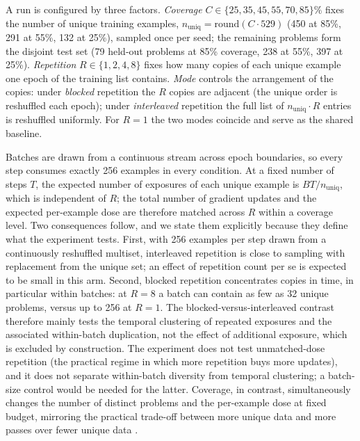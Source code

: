 \documentclass[10pt]{article}
\newcommand{\coverage}{C}
\newcommand{\repetition}{R}
\begin{document}
A run is configured by three factors. \emph{Coverage} $\coverage \in \{25,35,45,55,70,85\}\%$ fixes the number of unique training examples, $n_{\mathrm{uniq}} = \mathrm{round}(\coverage \cdot 529)$ (450 at 85\%, 291 at 55\%, 132 at 25\%), sampled once per seed; the remaining problems form the disjoint test set (79 held-out problems at 85\% coverage, 238 at 55\%, 397 at 25\%). \emph{Repetition} $\repetition \in \{1,2,4,8\}$ fixes how many copies of each unique example one epoch of the training list contains. \emph{Mode} controls the arrangement of the copies: under \emph{blocked} repetition the $\repetition$ copies are adjacent (the unique order is reshuffled each epoch); under \emph{interleaved} repetition the full list of $n_{\mathrm{uniq}} \cdot \repetition$ entries is reshuffled uniformly. For $\repetition = 1$ the two modes coincide and serve as the shared baseline.

Batches are drawn from a continuous stream across epoch boundaries, so every step consumes exactly 256 examples in every condition. At a fixed number of steps $T$, the expected number of exposures of each unique example is $BT/n_{\mathrm{uniq}}$, which is independent of $\repetition$; the total number of gradient updates and the expected per-example dose are therefore matched across $\repetition$ within a coverage level. Two consequences follow, and we state them explicitly because they define what the experiment tests. First, with 256 examples per step drawn from a continuously reshuffled multiset, interleaved repetition is close to sampling with replacement from the unique set; an effect of repetition count per se is expected to be small in this arm. Second, blocked repetition concentrates copies in time, in particular within batches: at $\repetition=8$ a batch can contain as few as 32 unique problems, versus up to 256 at $\repetition=1$. The blocked-versus-interleaved contrast therefore mainly tests the temporal clustering of repeated exposures and the associated within-batch duplication, not the effect of additional exposure, which is excluded by construction. The experiment does not test unmatched-dose repetition (the practical regime in which more repetition buys more updates), and it does not separate within-batch diversity from temporal clustering; a batch-size control would be needed for the latter. Coverage, in contrast, simultaneously changes the number of distinct problems and the per-example dose at fixed budget, mirroring the practical trade-off between more unique data and more passes over fewer unique data \citep{muennighoff2023scaling}.
\end{document}
